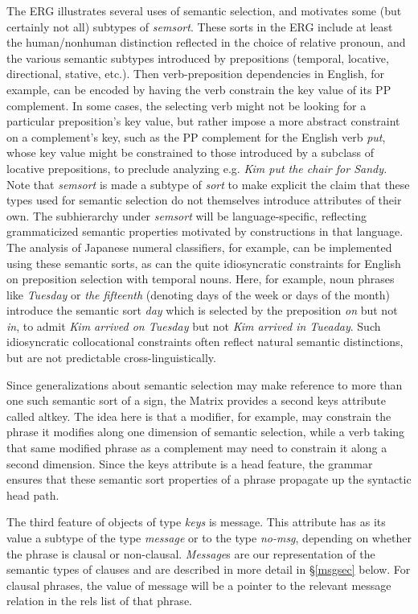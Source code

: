 \documentclass[12pt]{article}
\begin{document}
The ERG illustrates several uses of semantic selection, and motivates some
(but certainly not all) subtypes of {\it semsort}.  These sorts in the ERG
include at least the human/nonhuman distinction reflected in the choice of
relative pronoun, and the various semantic subtypes introduced by prepositions
(temporal, locative, directional, stative, etc.).  Then verb-preposition
dependencies in English, for example, can be encoded by having the verb
constrain the {\sc key} value of its PP complement.  In some cases, the
selecting verb might not be looking for a particular preposition's {\sc key}
value, but rather impose a more abstract constraint on a complement's key, such
as the PP complement for the English verb {\it put}, whose {\sc key} value
might be constrained to those introduced by a subclass of locative
prepositions, to preclude analyzing e.g. {\it *Kim put the chair for Sandy.}
Note that {\it semsort} is made a subtype of {\it sort} to make explicit the
claim that these types used for semantic selection do not themselves introduce
attributes of their own.  The subhierarchy under {\it semsort} will be
language-specific, reflecting grammaticized semantic properties motivated by
constructions in that language.  The analysis of Japanese numeral classifiers,
for example, can be implemented using these semantic sorts, as can the quite
idiosyncratic constraints for English on preposition selection with temporal
nouns.  Here, for example, noun phrases like {\it Tuesday} or {\it the
fifteenth} (denoting days of the week or days of the month) introduce the
semantic sort {\it day} which is selected by the preposition {\it on} but not
{\it in}, to admit {\it Kim arrived on Tuesday} but not {\it *Kim arrived in
Tueaday}.  Such idiosyncratic collocational constraints often reflect
natural semantic distinctions, but are not predictable cross-linguistically.  

Since generalizations about semantic selection may make reference to more than
one such semantic sort of a sign, the Matrix provides a second {\sc keys}
attribute called {\sc altkey}.  The idea here is that a modifier, for example,
may constrain the phrase it modifies along one dimension of semantic selection,
while a verb taking that same modified phrase as a complement may need to 
constrain it along a second dimension.  Since the {\sc keys} attribute is a
{\sc head} feature, the grammar ensures that these semantic sort properties
of a phrase propagate up the syntactic head path.

The third feature of objects of type {\it keys} is {\sc message}.
This attribute has as its value a subtype of the type {\it message} 
or to the type {\it no-msg}, depending on whether the phrase is clausal
or non-clausal.  {\it Message}s are our representation of the 
semantic types of clauses and are described in more detail in
\S\ref{msgsec} below.  For clausal phrases, the value of {\sc message}
will be a pointer to the relevant message relation in the {\sc rels} list
of that phrase.  
\end{document}

